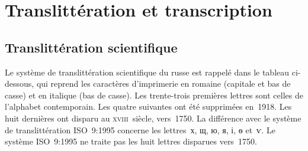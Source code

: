 \chapter[%
Translittération et transcription][%
Translittération et transcription]{%
Translittération et transcription}
\label{chap:Trans}

\section{Translittération scientifique}
\label{sec:Translitteration}

Le système de translittération scientifique du russe est rappelé dans le
tableau ci-dessous, qui reprend les caractères d'imprimerie en romaine
(capitale et bas de casse) et en italique (bas de casse).
Les trente-trois premières lettres sont celles de l'alphabet contemporain.
Les quatre suivantes ont été supprimées en~1918.
Les huit dernières ont disparu au \textsc{xviii}\ieme{}~siècle, vers~1750.
La différence avec le système de translittération ISO~9:1995 concerne les
lettres~х, щ, ю, я, і, ѳ et~ѵ.
Le système ISO~9:1995 ne traite pas les huit lettres disparues vers~1750.


